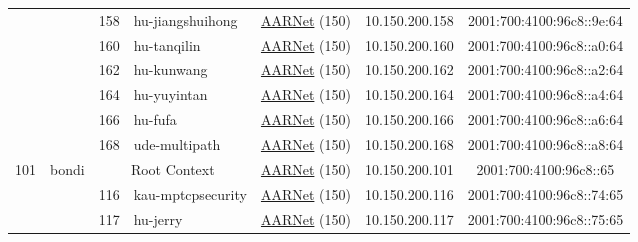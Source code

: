 \begin{small}
\begin{center}
\begin{longtable}{|c|c|c|c|c|c|c|c|}
  &  & \tiny{158} & \multicolumn{1}{|l|}{\tiny{hu-jiangshuihong}} & \multicolumn{2}{|c|}{\tiny{\href{https://www.aarnet.edu.au/}{AARNet} (150)}} & \tiny{10.150.200.158} & \tiny{2001:700:4100:96c8::9e:64} \\* \cline{3-3}\cline{4-4}\cline{5-5}\cline{6-6}\cline{7-7}\cline{8-8}
  &  & \tiny{160} & \multicolumn{1}{|l|}{\tiny{hu-tanqilin}} & \multicolumn{2}{|c|}{\tiny{\href{https://www.aarnet.edu.au/}{AARNet} (150)}} & \tiny{10.150.200.160} & \tiny{2001:700:4100:96c8::a0:64} \\* \cline{3-3}\cline{4-4}\cline{5-5}\cline{6-6}\cline{7-7}\cline{8-8}
  &  & \tiny{162} & \multicolumn{1}{|l|}{\tiny{hu-kunwang}} & \multicolumn{2}{|c|}{\tiny{\href{https://www.aarnet.edu.au/}{AARNet} (150)}} & \tiny{10.150.200.162} & \tiny{2001:700:4100:96c8::a2:64} \\* \cline{3-3}\cline{4-4}\cline{5-5}\cline{6-6}\cline{7-7}\cline{8-8}
  &  & \tiny{164} & \multicolumn{1}{|l|}{\tiny{hu-yuyintan}} & \multicolumn{2}{|c|}{\tiny{\href{https://www.aarnet.edu.au/}{AARNet} (150)}} & \tiny{10.150.200.164} & \tiny{2001:700:4100:96c8::a4:64} \\* \cline{3-3}\cline{4-4}\cline{5-5}\cline{6-6}\cline{7-7}\cline{8-8}
  &  & \tiny{166} & \multicolumn{1}{|l|}{\tiny{hu-fufa}} & \multicolumn{2}{|c|}{\tiny{\href{https://www.aarnet.edu.au/}{AARNet} (150)}} & \tiny{10.150.200.166} & \tiny{2001:700:4100:96c8::a6:64} \\* \cline{3-3}\cline{4-4}\cline{5-5}\cline{6-6}\cline{7-7}\cline{8-8}
  &  & \tiny{168} & \multicolumn{1}{|l|}{\tiny{ude-multipath}} & \multicolumn{2}{|c|}{\tiny{\href{https://www.aarnet.edu.au/}{AARNet} (150)}} & \tiny{10.150.200.168} & \tiny{2001:700:4100:96c8::a8:64} \\ \hline
 \multirow{30}{*}{\tiny{101}} & \multicolumn{1}{|l|}{\multirow{30}{*}{\tiny{bondi}}} & \multicolumn{2}{|c|}{\tiny{Root Context}} & \multicolumn{2}{|c|}{\tiny{\href{https://www.aarnet.edu.au/}{AARNet} (150)}} & \tiny{10.150.200.101} & \tiny{2001:700:4100:96c8::65} \\* \cline{3-3}\cline{4-4}\cline{5-5}\cline{6-6}\cline{7-7}\cline{8-8}
  &  & \tiny{116} & \multicolumn{1}{|l|}{\tiny{kau-mptcpsecurity}} & \multicolumn{2}{|c|}{\tiny{\href{https://www.aarnet.edu.au/}{AARNet} (150)}} & \tiny{10.150.200.116} & \tiny{2001:700:4100:96c8::74:65} \\* \cline{3-3}\cline{4-4}\cline{5-5}\cline{6-6}\cline{7-7}\cline{8-8}
  &  & \tiny{117} & \multicolumn{1}{|l|}{\tiny{hu-jerry}} & \multicolumn{2}{|c|}{\tiny{\href{https://www.aarnet.edu.au/}{AARNet} (150)}} & \tiny{10.150.200.117} & \tiny{2001:700:4100:96c8::75:65} \\* \cline{3-3}\cline{4-4}\cline{5-5}\cline{6-6}\cline{7-7}\cline{8-8}

\end{longtable}
\end{center}
\end{small}
